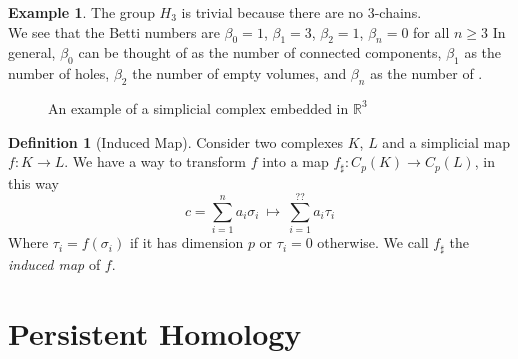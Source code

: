 \documentclass{article}
\newcommand{\R}{\mathbb{R}}
\theoremstyle{plain}
\theoremstyle{definition}
\newtheorem{definition}{Definition}[section]
\newtheorem{example}{Example}[section]
\theoremstyle{remark}
\begin{document}
\begin{example}
The group $H_3$ is trivial because there are no 3-chains. \\
We see that the Betti numbers are $\beta_0 = 1$, $\beta_1 = 3$, $\beta_2 = 1$, $\beta_n = 0$ for all $n \geq 3$
In general, $\beta_0$ can be thought of as the number of connected components, $\beta_1$ as the number of holes, $\beta_2$ the number of empty volumes, and  $\beta_n$ as the number of .
\end{example}

\begin{figure}[ht!]
\begin{center}
\caption{An example of a simplicial complex embedded in $\R^3$}
\label{fig:example1}
\end{center}
\end{figure}


\begin{definition}[Induced Map]
	Consider two complexes $K$, $L$ and a simplicial map $ f: K \to L $. We have a way to transform $f$ into a map $ f_\sharp: C_p(K) \to C_p(L) $, in this way 
	\[ c = \sum_{i=1}^n a_i \sigma_i \ \mapsto \ \sum_{i=1}^{??} a_i \tau_i  \]
	Where $ \tau_i = f(\sigma_i) $ if it has dimension $p$ or $ \tau_i =0 $ otherwise. We call $f_\sharp$ the \emph{induced map} of $f$.
\end{definition}

\section{Persistent Homology}
\end{document}
